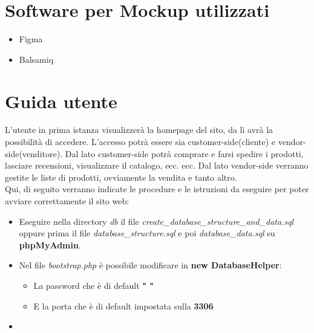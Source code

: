 \documentclass[a4paper,12pt]{report}
\begin{document}
	\section{Software per Mockup utilizzati}
	
	\begin{itemize}
		\item Figma
		\item Balsamiq
	\end{itemize}

	
	\newpage

	\section{Guida utente}
	L'utente in prima istanza visualizzerà la homepage del sito, da lì avrà la possibilità di accedere.
	L'accesso potrà essere sia customer-side(cliente) e vendor-side(venditore).
	Dal lato customer-side potrà comprare e farsi spedire i prodotti, lasciare recensioni, visualizzare il catalogo, ecc. ecc.
	Dal lato vendor-side verranno gestite le liste di prodotti, ovviamente la vendita e tanto altro.\\
	
	\textsf{\small Qui, di seguito verranno indicate le procedure e le istruzioni da eseguire per poter avviare correttamente il sito web: } \\
	
	\begin{itemize}
		\item \textsf{\small Eseguire nella directory \emph{db} il file \emph{create\_database\_structure\_and\_data.sql} oppure prima il file \emph{database\_structure.sql} e poi \emph{database\_data.sql} su \textbf{phpMyAdmin}.}
		\item \textsf{\small Nel file \emph{bootstrap.php} è possibile modificare in \textbf{new DatabaseHelper}:}
		\begin{itemize}
			\item \textsf{\small La password che è di default \textbf{" "}}
			\item \textsf{\small E la porta che è di default impostata sulla \textbf{3306}}
		\end{itemize}
		\item \textsf{\small }
	\end{itemize}
\end{document}
